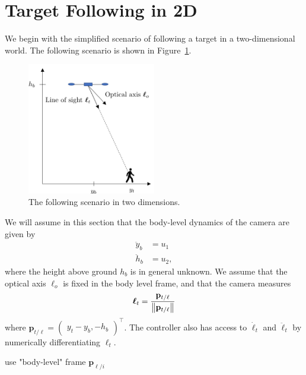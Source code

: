 \section{Target Following in 2D}

We begin with the simplified scenario of following a target in a two-dimensional world.  The following scenario is shown in Figure~\ref{fig:following_2d}.
\begin{figure}[hbt]
  \centering\includegraphics[width=0.5\textwidth]{./figures/following_2d}
  \caption{The following scenario in two dimensions.}
  \label{fig:following_2d}
\end{figure}

We will assume in this section that the body-level dynamics of the camera are given by
\begin{align*}
\ddot{y}_b &= u_1 \\
\ddot{h}_b &= u_2,	
\end{align*}
where the height above ground $h_b$ is in general unknown.  We assume that the optical axis $\boldsymbol{\ell}_o$ is fixed in the body level frame, and that the camera measures 
\[
\boldsymbol{\ell}_t = \frac{\mathbf{p}_{t/\ell}}{\left\|\mathbf{p}_{t/\ell}\right\|}
\]
where
$\mathbf{p}_{t/\ell}= \begin{pmatrix} y_t-y_b, -h_b \end{pmatrix}^\top$.  
The controller also has access to $\dot{\boldsymbol{\ell}}_t$ and $\ddot{\boldsymbol{\ell}}_t$ by numerically differentiating $\boldsymbol{\ell}_t$.  



use "body-level" frame $\mathbf{p}_{\ell/i}$



